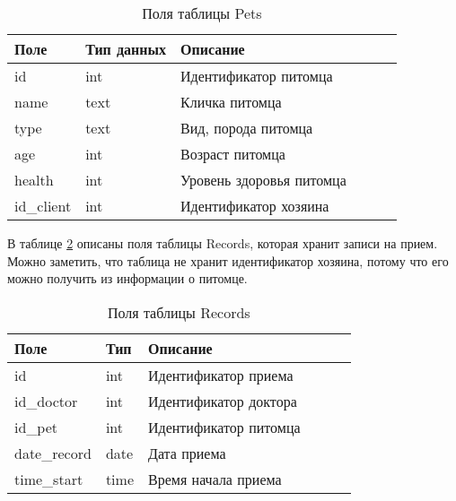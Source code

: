 \begin{table}[hbtp]
	\begin{center}
			\captionsetup{justification=raggedright, singlelinecheck=false}
			\caption{\label{tab:pets}Поля таблицы Pets}
		\begin{tabular}{|l|l|l|l|l|l|}
			\hline {Поле} & {Тип данных} & {Описание}  \\ \hline
			id  & int & Идентификатор питомца   \\ \hline
			name & text & Кличка питомца \\ \hline
			type & text & Вид, порода питомца  \\ \hline
			age & int & Возраст питомца \\ \hline
			health & int & Уровень здоровья питомца  \\ \hline
			id\_client & int & Идентификатор хозяина  \\ \hline
		\end{tabular}
	\end{center}
\end{table}

В таблице \ref{tab:records}  описаны поля таблицы Records, которая хранит записи на прием. Можно заметить, что таблица не хранит идентификатор хозяина, потому что его можно получить из информации о питомце. 

\begin{table}[hbtp]
		\captionsetup{justification=raggedright, singlelinecheck=false}
		\caption{\label{tab:records}Поля таблицы Records}
	\begin{center}
		\begin{tabular}{|l|l|l|l|l|l|}
			\hline {Поле} & {Тип} & {Описание}  \\ \hline
			id  & int & Идентификатор приема   \\ \hline
			id\_doctor & int & Идентификатор доктора  \\ \hline
			id\_pet & int & Идентификатор питомца   \\ \hline
			date\_record & date & Дата приема \\ \hline
			time\_start & time & Время начала приема  \\ \hline
		\end{tabular}
	\end{center}
\end{table}

\pagebreak

